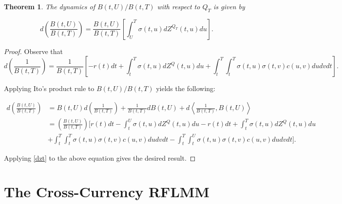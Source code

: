 \documentclass[11pt]{article}
\newtheorem{theorem}{Theorem}[section]
\begin{document}


\begin{theorem}\label{relativebond}
The dynamics of $B(t,U)/B(t,T)$ with respect to $Q_T$ is given by 

\begin{equation}\label{bondqt}
    d\left(\frac{B(t,U)}{B(t,T)}\right)=\frac{B(t,U)}{B(t,T)}\left[\int_U^T \sigma(t,u)dZ^{Q_T}(t,u)du\right].
\end{equation}


\end{theorem}

\begin{proof}
Observe that
\begin{equation*}
    d\left(\frac{1}{B(t,T)}\right)=\frac{1}{B(t,T)}\left[-r(t)dt+\int_t^T\sigma(t,u)dZ^Q(t,u)du+\int_t^T\int_t^T\sigma(t,u)\sigma(t,v)c(u,v)dudvdt\right].
\end{equation*}

Applying Ito's product rule to $B(t,U)/B(t,T)$ yields the following:

\begin{equation*}
\begin{split}
     d\left(\frac{B(t,U)}{B(t,T)}\right)&=B(t,U)d\left(\frac{1}{B(t,T)}\right)+\frac{1}{B(t,T)}dB(t,U)+d\left<\frac{1}{B(t,T)},B(t,U)\right>\\
     &=\left(\frac{B(t,U)}{B(t,T)}\right)\Bigg[r(t)dt-\int_t^U\sigma(t,u)dZ^Q(t,u)du-r(t)dt+\int_t^T\sigma(t,u)dZ^Q(t,u)du \\
     &+\int_t^T\int_t^T\sigma(t,u)\sigma(t,v)c(u,v)dudvdt-\int_t^T\int_t^U\sigma(t,u)\sigma(t,v)c(u,v)dudvdt\Bigg].
\end{split}
\end{equation*}

Applying \eqref{dzt} to the above equation gives the desired result.
\end{proof}






\section{The Cross-Currency RFLMM}
\end{document}
